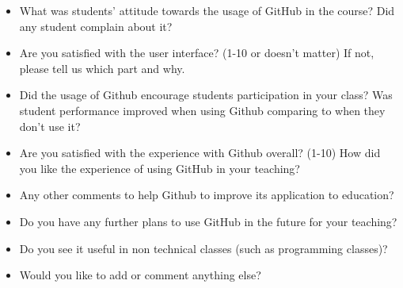\begin{itemize}
    \item What was students’ attitude towards the usage of GitHub in the course? Did any student complain about it?
    \item Are you satisfied with the user interface? (1-10 or doesn’t matter) If not, please tell us which part and why.
    \item Did the usage of Github encourage students participation in your class? Was student performance improved when using Github comparing to when they don’t use it?
    \item Are you satisfied with the experience with Github overall? (1-10) How did you like the experience of using GitHub in your teaching?
    \item Any other comments to help Github to improve its application to education?
    \item Do you have any further plans to use GitHub in the future for your teaching?
    \item Do you see it useful in non technical classes (such as programming classes)?
    \item Would you like to add or comment anything else?
\end{itemize}

